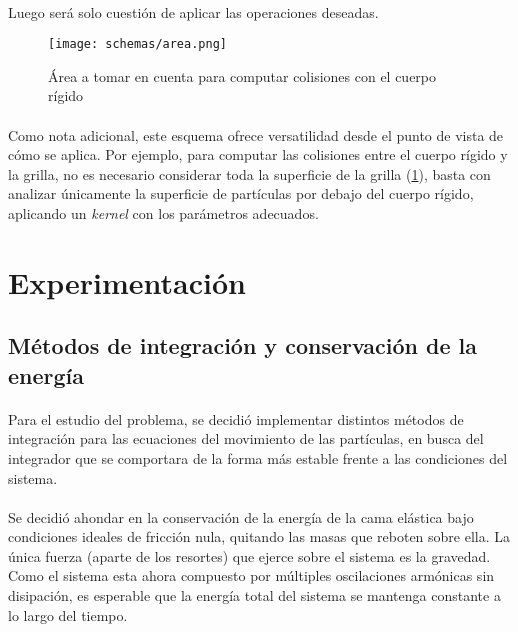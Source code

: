 \documentclass[12pt, twocolumn]{article}
\begin{document}
    \paragraph{} Luego será solo cuestión de aplicar las operaciones deseadas.
    
    \begin{figure}[H]
		\centering
		\texttt{[image: schemas/area.png]}
		\caption{Área a tomar en cuenta para computar colisiones con el cuerpo rígido}
		\label{area}
	\end{figure}
    
    \paragraph{} Como nota adicional, este esquema ofrece versatilidad desde el punto de vista de cómo se aplica. Por ejemplo, para computar las colisiones entre el cuerpo rígido y la grilla, no es necesario considerar toda la superficie de la grilla (\ref{area}), basta con analizar únicamente la superficie de partículas por debajo del cuerpo rígido, aplicando un \textit{kernel} con los parámetros adecuados.
	
	\section{Experimentación}
	
	
	\subsection{Métodos de integración y conservación de la energía}
	\paragraph{} Para el estudio del problema, se decidió implementar distintos métodos de integración para las ecuaciones del movimiento de las partículas, en busca del integrador que se comportara de la forma más estable frente a las condiciones del sistema.
	
	\paragraph{} Se decidió ahondar en la conservación de la energía de la cama elástica bajo condiciones ideales de fricción nula, quitando las masas que reboten sobre ella. La única fuerza (aparte de los resortes) que ejerce sobre el sistema es la gravedad. Como el sistema esta ahora compuesto por múltiples oscilaciones armónicas sin disipación, es esperable que la energía total del sistema se mantenga constante a lo largo del tiempo.
	
\end{document}
